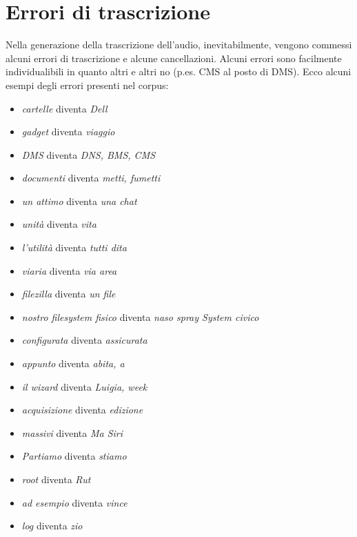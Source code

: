 
\chapter{Errori di trascrizione}
\label{cap:esempi-errori}
Nella generazione della trascrizione dell'audio, inevitabilmente, vengono commessi alcuni errori di trascrizione e alcune cancellazioni. Alcuni errori sono facilmente individualibili in quanto altri e altri no (p.es. CMS al posto di DMS). Ecco alcuni esempi degli errori presenti nel corpus:
\begin{itemize}
    \item \textit{cartelle} diventa \textit{Dell}
    \item \textit{gadget} diventa \textit{viaggio}
    \item \textit{DMS} diventa \textit{DNS, BMS, CMS}
    \item \textit{documenti} diventa \textit{metti, fumetti}
    \item \textit{un attimo} diventa \textit{una chat}
    \item \textit{unità} diventa \textit{vita}
    \item \textit{l’utilità} diventa \textit{tutti dita}
    \item \textit{viaria} diventa \textit{via area}
    \item \textit{filezilla} diventa \textit{un file}
    \item \textit{nostro filesystem fisico} diventa \textit{naso spray System civico}
    \item \textit{configurata} diventa \textit{assicurata}
    \item \textit{appunto} diventa \textit{abita, a}
    \item \textit{il wizard} diventa \textit{Luigia, week}
    \item \textit{acquisizione} diventa \textit{edizione}
    \item \textit{massivi} diventa \textit{Ma Siri}
    \item \textit{Partiamo} diventa \textit{stiamo}
    \item \textit{root} diventa  \textit{Rut}
    \item \textit{ad esempio} diventa \textit{vince}
    \item \textit{log} diventa \textit{zio}

\end{itemize}
